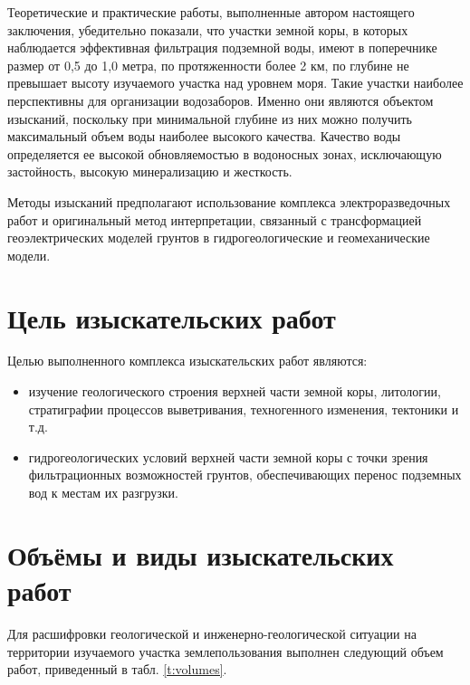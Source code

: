 Теоретические и практические работы, выполненные автором настоящего заключения, убедительно показали, что участки земной коры, в которых наблюдается эффективная фильтрация подземной воды, имеют в поперечнике размер от 0,5 до 1,0 метра, по протяженности более 2 км, по глубине не превышает высоту изучаемого участка над уровнем моря. Такие участки наиболее перспективны для организации водозаборов. Именно они являются объектом изысканий, поскольку при минимальной глубине из них можно получить максимальный объем воды наиболее высокого качества. Качество воды определяется ее высокой обновляемостью в водоносных зонах, исключающую застойность, высокую минерализацию и жесткость.

Методы изысканий предполагают использование комплекса электроразведочных работ и оригинальный метод интерпретации, связанный с трансформацией геоэлектрических моделей грунтов в гидрогеологические и геомеханические модели.

\section{Цель изыскательских работ}
Целью выполненного комплекса изыскательских работ являются:
\begin{itemize}
	\item изучение геологического строения верхней части земной коры, литологии, стратиграфии процессов выветривания, техногенного изменения, тектоники и т.д.
	\item гидрогеологических условий верхней части земной коры с точки зрения фильтрационных возможностей грунтов, обеспечивающих перенос подземных вод к местам их разгрузки.
\end{itemize}


\section{Объёмы и виды изыскательских работ}
Для расшифровки геологической и инженерно-геологической ситуации на территории изучаемого участка землепользования выполнен следующий объем работ, приведенный в табл. {\ref{t:volumes}}.


